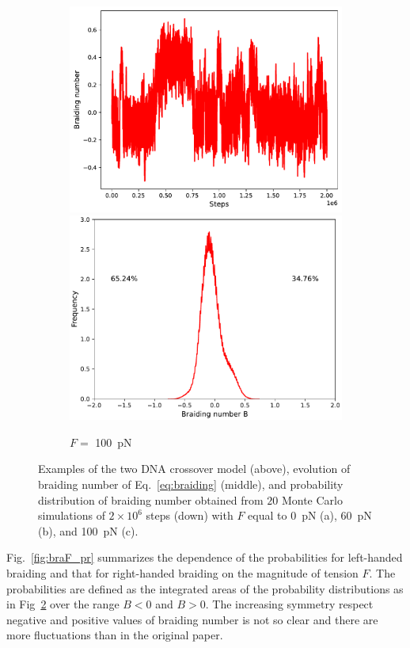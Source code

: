 \documentclass[a4paper,10pt]{article}
\begin{document}
\begin{figure}[tb]
\begin{subfigure}{.3\textwidth}
\includegraphics[width=\textwidth]{brF_100_braid.pdf}
\includegraphics[width=\textwidth]{brF_100_br_pr.pdf}
\caption{$F=$ \SI{100}{\pico\newton}}
\label{fig:braF_c}
\end{subfigure}
\caption{Examples of the two DNA crossover model (above), evolution of braiding number of Eq.~\ref{eq:braiding} (middle), and probability distribution of braiding number obtained from $20$ Monte Carlo simulations of $2\times 10^6$ steps (down) with $F$ equal to \SI{0}{\pico\newton} (a), \SI{60}{\pico\newton} (b), and \SI{100}{\pico\newton} (c).}
\label{fig:braF}
\end{figure}

Fig.~\ref{fig:braF_pr} summarizes the dependence of the probabilities for left-handed braiding and that for right-handed braiding on the magnitude of tension $F$.
The probabilities are defined as the integrated areas of the probability distributions as in Fig~\ref{fig:braF} over the range $B<0$ and $B>0$.
The increasing symmetry respect negative and positive values of braiding number is not so clear and there are more fluctuations than in the original paper.
\end{document}
